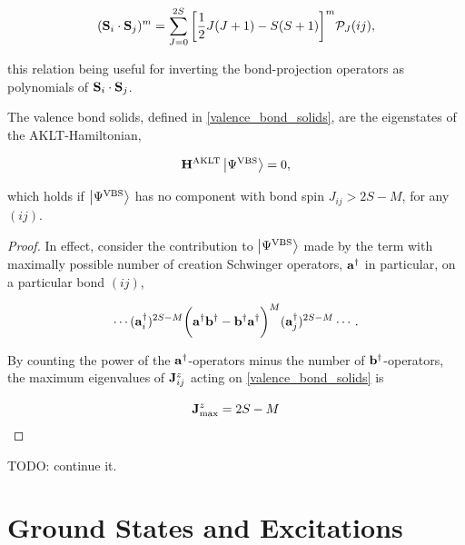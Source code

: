 \documentclass{homework}
\begin{document}
\begin{equation}
    ({\bf S}_i \cdot {\bf S}_j)^m = \sum_{J = 0}^{2S} \bigg[\frac{1}{2} J(J+1) - S(S+1)\bigg]^m \mathcal{P}_J (ij),
\end{equation}

this relation being useful for inverting the bond-projection operators as polynomials of ${\bf S}_i \cdot {\bf S}_j$. \\

\begin{lemma}

The valence bond solids, defined in \cref{valence_bond_solids}, are the eigenstates of the AKLT-Hamiltonian, 

\begin{equation}
     {\bf H}^{\textnormal{AKLT}} \ket{\Psi^{\textnormal{VBS}}} = 0,
\end{equation}

which holds if $\ket{\Psi^{\textnormal{VBS}}}$ has no component with bond spin $J_{ij} > 2S - M $, for any $(ij)$.

\end{lemma}

\begin{proof}

In effect, consider the contribution to $\ket{\Psi^{\textnormal{VBS}}}$ made by the term with maximally possible number of creation Schwinger operators, ${\bf a}^\dagger$ in particular, on a particular bond $(ij)$,

\begin{equation}
    \cdots ({\bf a}_i^\dagger)^{2S-M} \bigg({\bf a}^\dagger {\bf b}^\dagger - {\bf b}^\dagger {\bf a}^\dagger \bigg)^{M} ({\bf a}_j^\dagger)^{2S-M}\cdots.
\end{equation}

By counting the power of the ${\bf a}^\dagger$-operators minus the number of ${\bf b}^\dagger$-operators, the maximum eigenvalues of ${\bf J}_{ij}^z$ acting on \cref{valence_bond_solids}
is 

\begin{equation}
    {\bf J}^z_{\textnormal{max}} = 2S-M
\end{equation}

\end{proof}

TODO: continue it. 

\clearpage

\section{\textbf{Ground States and Excitations}}
\end{document}
